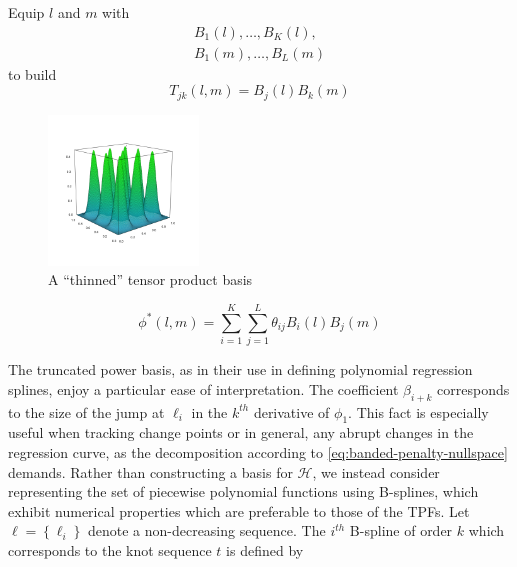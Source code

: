 \documentclass[12pt]{article}
\theoremstyle{definition}
\begin{document}
Equip $l$ and $m$ with
\begin{align*}
B_{1}\left(l\right),\dots, B_{K}\left(l\right),\\
B_{1}\left(m\right),\dots, B_{L}\left(m\right)
\end{align*}
to build
\begin{equation*}
T_{jk}\left(l,m\right) = B_j\left(l\right){B}_k\left(m\right)
\end{equation*}
    \begin{center}
    \begin{figure}
    \graphicspath{{img/}}
 \includegraphics[width=4cm]{sparse_bicubic_basis}
 \caption{A ``thinned'' tensor product basis}
 \end{figure}
     \end{center}
\begin{equation*}
\phi^*\left(l,m\right) = \sum_{i=1}^K \sum_{j=1}^L \theta_{ij} B_{i}\left(l\right) B_{j}\left(m\right)
\end{equation*}



The truncated power basis, as in their use in defining polynomial regression splines, enjoy a particular ease of interpretation. The coefficient $\beta_{i+k}$ corresponds to the size of the jump at $\ell_i$ in the $k^{th}$ derivative of $\phi_1$. This fact is especially useful when tracking change points or in general, any abrupt changes in the regression curve, as the decomposition according to \ref{eq:banded-penalty-nullspace} demands. Rather than constructing a basis for $\mathcal{H}$, we instead consider representing the set of piecewise polynomial functions using B-splines, which exhibit numerical properties which are preferable to those of the TPFs. Let $\ell= \left\{ \ell_i \right\}$ denote a non-decreasing sequence. The $i^{th}$ B-spline of order $k$ which corresponds to the knot sequence $t$ is defined by 
\end{document}
